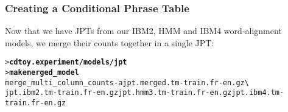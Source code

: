 \documentclass[11pt,letterpaper]{article}
\newcommand{\bs}{\textbackslash{}}
\begin{document}
\subsubsection{Creating a Conditional Phrase Table} \label{CPT}

Now that we have JPTs from our IBM2, HMM and IBM4
word-alignment models, we merge their counts together in a single JPT:
\begin{small}
\begin{alltt}
   > \textbf{cd toy.experiment/models/jpt}
   > \textbf{make merged_model}
   merge_multi_column_counts -a jpt.merged.tm-train.fr-en.gz \bs
      jpt.ibm2.tm-train.fr-en.gz jpt.hmm3.tm-train.fr-en.gz jpt.ibm4.tm-train.fr-en.gz
\end{alltt}
\end{small}
\end{document}
